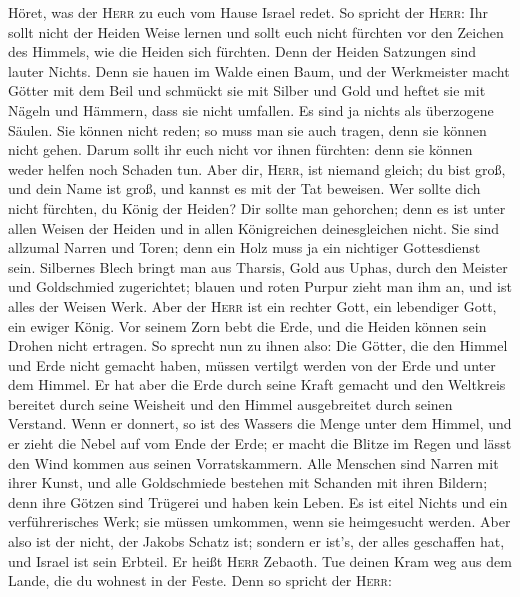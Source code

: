  Höret, was der \textsc{Herr} zu euch vom Hause Israel
redet.  So spricht der \textsc{Herr}: Ihr sollt nicht der
Heiden Weise lernen und sollt euch nicht fürchten vor den Zeichen des
Himmels, wie die Heiden sich fürchten.  Denn der Heiden
Satzungen sind lauter Nichts. Denn sie hauen im Walde einen Baum, und
der Werkmeister macht Götter mit dem Beil  und schmückt
sie mit Silber und Gold und heftet sie mit Nägeln und Hämmern, dass sie
nicht umfallen.  Es sind ja nichts als überzogene Säulen.
Sie können nicht reden; so muss man sie auch tragen, denn sie können
nicht gehen. Darum sollt ihr euch nicht vor ihnen fürchten: denn sie
können weder helfen noch Schaden tun.  Aber dir,
\textsc{Herr}, ist niemand gleich; du bist groß, und dein Name ist groß,
und kannst es mit der Tat beweisen.  Wer sollte dich nicht
fürchten, du König der Heiden? Dir sollte man gehorchen; denn es ist
unter allen Weisen der Heiden und in allen Königreichen deinesgleichen
nicht.  Sie sind allzumal Narren und Toren; denn ein Holz
muss ja ein nichtiger Gottesdienst sein.  Silbernes Blech
bringt man aus Tharsis, Gold aus Uphas, durch den Meister und
Goldschmied zugerichtet; blauen und roten Purpur zieht man ihm an, und
ist alles der Weisen Werk.  Aber der \textsc{Herr} ist
ein rechter Gott, ein lebendiger Gott, ein ewiger König. Vor seinem Zorn
bebt die Erde, und die Heiden können sein Drohen nicht ertragen.
 So sprecht nun zu ihnen also: Die Götter, die den Himmel
und Erde nicht gemacht haben, müssen vertilgt werden von der Erde und
unter dem Himmel.  Er hat aber die Erde durch seine Kraft
gemacht und den Weltkreis bereitet durch seine Weisheit und den Himmel
ausgebreitet durch seinen Verstand.  Wenn er donnert, so
ist des Wassers die Menge unter dem Himmel, und er zieht die Nebel auf
vom Ende der Erde; er macht die Blitze im Regen und lässt den Wind
kommen aus seinen Vorratskammern.  Alle Menschen sind
Narren mit ihrer Kunst, und alle Goldschmiede bestehen mit Schanden mit
ihren Bildern; denn ihre Götzen sind Trügerei und haben kein Leben.
 Es ist eitel Nichts und ein verführerisches Werk; sie
müssen umkommen, wenn sie heimgesucht werden.  Aber also
ist der nicht, der Jakobs Schatz ist; sondern er ist's, der alles
geschaffen hat, und Israel ist sein Erbteil. Er heißt \textsc{Herr}
Zebaoth.  Tue deinen Kram weg aus dem Lande, die du
wohnest in der Feste.  Denn so spricht der \textsc{Herr}:
